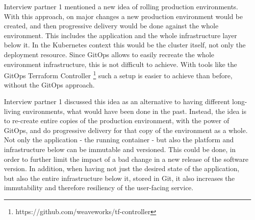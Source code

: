Interview partner 1 mentioned a new idea of
rolling production environments.
With this approach,
on major changes a new production environment would be created,
and then progressive delivery would be done against the whole environment.
This includes the application and the whole infrastructure layer below it.
In the Kubernetes context this would be the cluster itself, not only the deployment resource.
Since GitOps allows to easily recreate the whole environment infrastructure,
this is not difficult to achieve.
With tools like the GitOps Terraform Controller
\nolinebreak
\footnote{https://github.com/weaveworks/tf-controller}
such a setup is easier to achieve than before, without the GitOps approach.


Interview partner 1 discussed this idea as an alternative to having different long-living environments,
what would have been done in the past.
Instead, the idea is to re-create entire copies of the production environment,
with the power of GitOps,
and do progressive delivery for that copy of the environment as a whole.
Not only the application - the running container - but also the platform and infrastructure below
can be immutable and versioned.
This could be done, in order to further limit the impact of a bad change in a new release of the software version.
In addition, when having not just the desired state of the application, but also the entire infrastructure below it,
stored in Git,
it also increases the immutability and therefore resiliency of the user-facing service.

